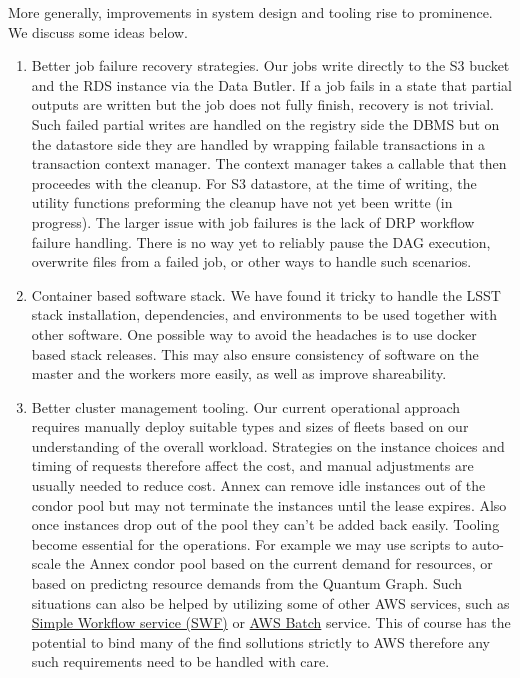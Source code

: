 More generally, improvements in system design and tooling rise to prominence.
We discuss some ideas below.

\begin{enumerate}
\item Better job failure recovery strategies.
Our jobs write directly to the S3 bucket and the RDS instance via the Data Butler.
If a job fails in a state that partial outputs are written but the job does not fully finish, recovery is not trivial. Such failed partial writes are handled on the registry side the DBMS but on the datastore side they are handled by wrapping failable transactions in a transaction context manager. The context manager takes a callable that then proceedes with the cleanup. For S3 datastore, at the time of writing, the utility functions preforming the cleanup have not yet been writte (in progress). The larger issue with job failures is the lack of DRP workflow failure handling. There is no way yet to reliably pause the DAG execution, overwrite files from a failed job, or other ways to handle such scenarios.
\item Container based software stack.
We have found it tricky to handle the LSST stack installation, dependencies, and environments to be used together with other software. One possible way to avoid the headaches is to use docker based stack releases. This may also ensure consistency of software on the master and the workers more easily, as well as improve shareability.
\item Better cluster management tooling.
Our current operational approach requires manually deploy suitable types and sizes of fleets based on our understanding of the overall workload.
Strategies on the instance choices and timing of requests therefore affect the cost, and manual adjustments are usually needed to reduce cost.
Annex can remove idle instances out of the condor pool but may not terminate the instances until the lease expires.
Also once instances drop out of the pool they can't be added back easily.
Tooling become essential for the operations.
For example we may use scripts to auto-scale the Annex condor pool based on the current demand for resources, or based on predictng resource demands from the Quantum Graph. Such situations can also be helped by utilizing some of other AWS services, such as \href{https://aws.amazon.com/swf/}{Simple Workflow service (SWF)} or \href{https://aws.amazon.com/batch/}{AWS Batch} service. This of course has the potential to bind many of the find sollutions strictly to AWS therefore any such requirements need to be handled with care.

\end{enumerate}
